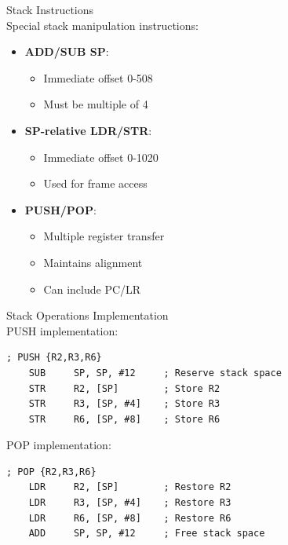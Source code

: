 \begin{concept}{Stack Instructions}\\
Special stack manipulation instructions:
\begin{itemize}
  \item \textbf{ADD/SUB SP}:
    \begin{itemize}
      \item Immediate offset 0-508
      \item Must be multiple of 4
    \end{itemize}
  \item \textbf{SP-relative LDR/STR}:
    \begin{itemize}
      \item Immediate offset 0-1020
      \item Used for frame access
    \end{itemize}
  \item \textbf{PUSH/POP}:
    \begin{itemize}
      \item Multiple register transfer
      \item Maintains alignment
      \item Can include PC/LR
    \end{itemize}
\end{itemize}
\end{concept}

\begin{example2}{Stack Operations Implementation}\\
PUSH implementation:
\begin{lstlisting}[language=armasm, style=basesmol]
    ; PUSH {R2,R3,R6}
    SUB     SP, SP, #12     ; Reserve stack space
    STR     R2, [SP]        ; Store R2
    STR     R3, [SP, #4]    ; Store R3
    STR     R6, [SP, #8]    ; Store R6
\end{lstlisting}

POP implementation:
\begin{lstlisting}[language=armasm, style=basesmol]
    ; POP {R2,R3,R6}
    LDR     R2, [SP]        ; Restore R2
    LDR     R3, [SP, #4]    ; Restore R3
    LDR     R6, [SP, #8]    ; Restore R6
    ADD     SP, SP, #12     ; Free stack space
\end{lstlisting}
\end{example2}





